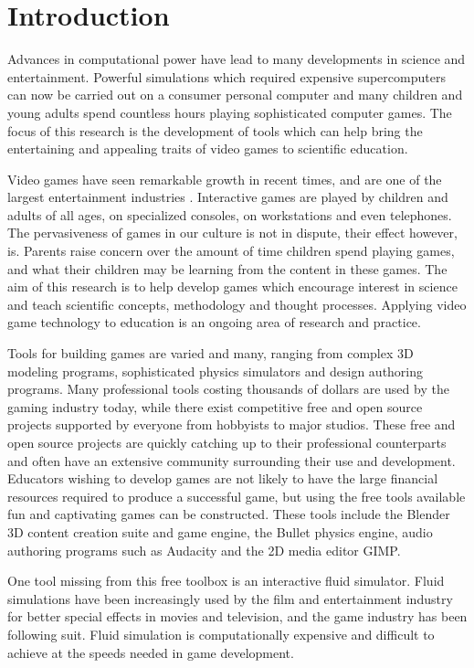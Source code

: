 \chapter{Introduction}
\label{chapter:introduction}

Advances in computational power have lead to many developments in science and
entertainment. Powerful simulations which required expensive supercomputers can
now be carried out on a consumer personal computer and many children and young
adults spend countless hours playing sophisticated computer games. The focus of
this research is the development of tools which can help bring the entertaining
and appealing traits of video games to scientific education.


Video games have seen remarkable growth in recent times, and are one of the
largest entertainment industries \cite{Kafai2006}. Interactive games are played by
children and adults of all ages, on specialized consoles, on workstations and
even telephones. The pervasiveness of games in our culture is not in dispute,
their effect however, is.\cite{Ferguson2007} Parents raise concern over the amount of time
children spend playing games, and what their children may be learning from the
content in these games. The aim of this research is to help develop games which
encourage interest in science and teach scientific concepts, methodology and
thought processes. Applying video game technology to education is an ongoing
area of research and practice\cite{Hayes2008}. 


Tools for building games are varied and many, ranging from complex 3D modeling
programs, sophisticated physics simulators and design authoring programs. Many
professional tools costing thousands of dollars are used by the gaming industry
today, while there exist competitive free and open source projects supported by
everyone from hobbyists to major studios. These free and open source projects
are quickly catching up to their professional counterparts and often have an
extensive community surrounding their use and development. Educators wishing to
develop games are not likely to have the large financial resources required to
produce a successful game, but using the free tools available fun and
captivating games can be constructed. These tools include the Blender 3D
content creation suite and game engine, the Bullet physics engine, audio
authoring programs such as Audacity and the 2D media editor GIMP. 


One tool missing from this free toolbox is an interactive fluid simulator.
Fluid simulations have been increasingly used by the film and entertainment
industry for better special effects in movies and television, and the game
industry has been following suit. Fluid simulation is computationally expensive
and difficult to achieve at the speeds needed in game development. 

